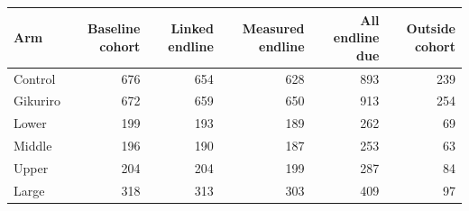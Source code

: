 \begin{tabular}{lrrrrr}
\toprule
Arm & Baseline cohort & Linked endline & Measured endline & All endline due & Outside cohort \\
\midrule
Control & 676 & 654 & 628 & 893 & 239 \\
Gikuriro & 672 & 659 & 650 & 913 & 254 \\
Lower & 199 & 193 & 189 & 262 & 69 \\
Middle & 196 & 190 & 187 & 253 & 63 \\
Upper & 204 & 204 & 199 & 287 & 84 \\
Large & 318 & 313 & 303 & 409 & 97 \\
\bottomrule
\end{tabular}
